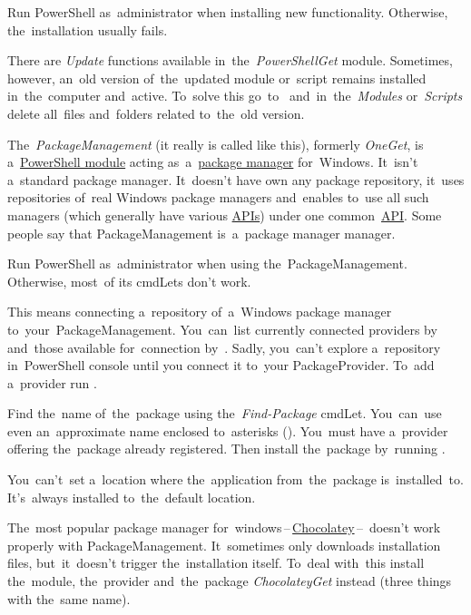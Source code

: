 \warning Run PowerShell as~administrator when installing new functionality.
Otherwise, the~installation usually fails.

There are \textit{Update} functions available in~the~\textit{PowerShellGet} module.
Sometimes, however, an~old version of~the~updated module or~script remains installed in~the~computer and~active.
To~solve this go~to~ and~in~the~\textit{Modules} or~\textit{Scripts} delete all~files and~folders related to~the~old version.

\label{windowspackagemanagement}
The~\textit{PackageManagement} (it really is called like this), formerly \textit{OneGet}, is a~\hyperref[powershellmodule]{PowerShell module} acting as~a~\hyperref[packagemanager]{package manager} for~Windows.
It~isn't a~standard package manager.
It~doesn't have own any package repository, it~uses repositories of~real Windows package managers and~enables to~use all such managers (which generally have various \hyperref[api]{APIs}) under one common~\hyperref[api]{API}.
Some people say that PackageManagement is~a~package manager manager.

\warning Run PowerShell as~administrator when using the~PackageManagement.
Otherwise, most~of its cmdLets don't work.

This means connecting a~repository of~a~Windows package manager to~your~PackageManagement.
You~can~list currently connected providers by~ and~those available for~connection by~.
Sadly, you~can't explore a~repository in~PowerShell console until you connect it to~your PackageProvider.
To~add a~provider run .

Find the~name of~the~package using the~\textit{Find-Package} cmdLet.
You~can~use even an~approximate name enclosed to~asterisks ().
You~must have a~provider offering the~package already registered.
Then install the~package by~running .

\note You~can't~set a~location where the~application from~the~package is~installed~to.
It's~always installed to~the~default location.

\warning The~most popular package manager for~windows\,--\,\href{https://chocolatey.org/}{Chocolatey}\,--\, doesn't work properly with PackageManagement.
It~sometimes only downloads installation files, but~it~doesn't trigger the~installation itself.
To~deal with~this install the~module, the~provider and~the~package \textit{ChocolateyGet} instead (three things with the~same name).
